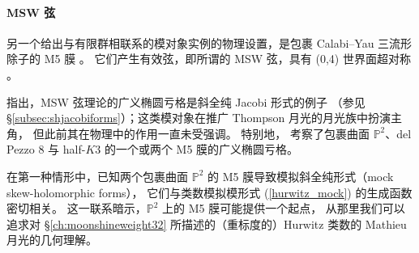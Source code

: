 \documentclass[11pt,a4paper,fontset=windows]{ctexart}
\numberwithin{equation}{section}
\newcommand{\myparagraph}[1]{\paragraph{#1}\mbox\\}
\newcommand{\PP}{\mathbb{P}}
\newcommand{\eq}[1]{(\ref{#1})}
\begin{document}
\myparagraph{MSW 弦}

另一个给出与有限群相联系的模对象实例的物理设置，是包裹 Calabi–Yau 三流形除子的 M5 膜 \cite{Cheng:2017dlj}。
它们产生有效弦，即所谓的 MSW 弦，具有 (0,4) 世界面超对称 \cite{Maldacena:1997de}。


\cite{Cheng:2017dlj} 指出，MSW 弦理论的广义椭圆亏格是斜全纯 Jacobi 形式的例子
（参见 \S\ref{subsec:shjacobiforms}）；这类模对象在推广 Thompson 月光的月光族中扮演主角，
但此前其在物理中的作用一直未受强调。
特别地，\cite{Cheng:2017dlj} 考察了包裹曲面 $\PP^2$、del Pezzo 8 与 half-$K3$ 的一个或两个 M5 膜的广义椭圆亏格。




在第一种情形中，已知两个包裹曲面 $\PP^2$ 的 M5 膜导致模拟斜全纯形式（mock skew-holomorphic forms），
它们与类数模拟模形式 \eq{hurwitz_mock} 的生成函数密切相关。
这一联系暗示，$\PP^2$ 上的 M5 膜可能提供一个起点，
从那里我们可以追求对 \S\ref{ch:moonshineweight32} 所描述的（重标度的）Hurwitz 类数的 Mathieu 月光的几何理解。

\end{document}

